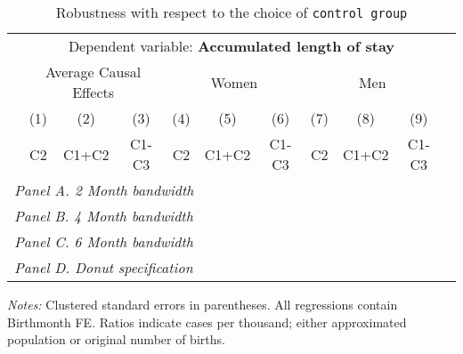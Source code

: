  \begin{table}[H] \begin{threeparttable} \centering \caption{Robustness with respect to the choice of \texttt{control group}} {\def\sym#1{\ifmmode^{#1}\else\(^{#1}\)\fi} \begin{tabular}{l*{10}{c}} \toprule & \multicolumn{9}{c}{Dependent variable: \textbf{Accumulated length of stay}} \\ \cmidrule(lr){2-10}
            &\multicolumn{3}{c}{Average Causal Effects}&\multicolumn{3}{c}{Women}             &\multicolumn{3}{c}{Men}               \\\cmidrule(lr){2-4}\cmidrule(lr){5-7}\cmidrule(lr){8-10}
            &\multicolumn{1}{c}{(1)}&\multicolumn{1}{c}{(2)}&\multicolumn{1}{c}{(3)}&\multicolumn{1}{c}{(4)}&\multicolumn{1}{c}{(5)}&\multicolumn{1}{c}{(6)}&\multicolumn{1}{c}{(7)}&\multicolumn{1}{c}{(8)}&\multicolumn{1}{c}{(9)}\\
            &\multicolumn{1}{c}{C2}&\multicolumn{1}{c}{C1+C2}&\multicolumn{1}{c}{C1-C3}&\multicolumn{1}{c}{C2}&\multicolumn{1}{c}{C1+C2}&\multicolumn{1}{c}{C1-C3}&\multicolumn{1}{c}{C2}&\multicolumn{1}{c}{C1+C2}&\multicolumn{1}{c}{C1-C3}\\
\midrule
 \multicolumn{10}{l}{\emph{Panel A. 2 Month bandwidth}} \\    \midrule\multicolumn{10}{l}{\emph{Panel B. 4 Month bandwidth}} \\    \midrule\multicolumn{10}{l}{\emph{Panel C. 6 Month bandwidth}} \\    \midrule\multicolumn{10}{l}{\emph{Panel D. Donut specification}} \\    
\bottomrule \end{tabular} } \begin{tablenotes} \item \scriptsize \emph{Notes:} Clustered standard errors in parentheses. All regressions contain Birthmonth FE. Ratios indicate cases per thousand; either approximated population or original number of births. \end{tablenotes} \end{threeparttable} \end{table} 
